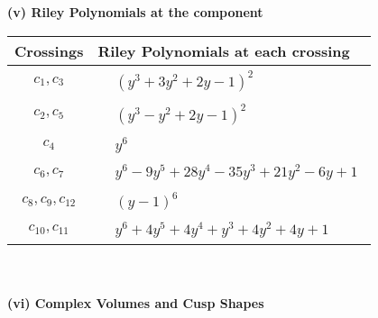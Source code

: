 \documentclass[1p]{elsarticle_modified}
\theoremstyle{definition}
\begin{document}
\newpage\renewcommand{\arraystretch}{1}
\flushleft \textbf{(v) Riley Polynomials at the component}\newline \\
\begin{tabular}{m{50pt}|m{274pt}}
Crossings & \hspace{64pt}Riley Polynomials at each crossing \\
\hline $$\begin{aligned}c_{1},c_{3}\end{aligned}$$&$\begin{aligned}
&(y^3+3 y^2+2 y-1)^2
\end{aligned}$\\
\hline $$\begin{aligned}c_{2},c_{5}\end{aligned}$$&$\begin{aligned}
&(y^3- y^2+2 y-1)^2
\end{aligned}$\\
\hline $$\begin{aligned}c_{4}\end{aligned}$$&$\begin{aligned}
&y^6
\end{aligned}$\\
\hline $$\begin{aligned}c_{6},c_{7}\end{aligned}$$&$\begin{aligned}
&y^6-9 y^5+28 y^4-35 y^3+21 y^2-6 y+1
\end{aligned}$\\
\hline $$\begin{aligned}c_{8},c_{9},c_{12}\end{aligned}$$&$\begin{aligned}
&(y-1)^6
\end{aligned}$\\
\hline $$\begin{aligned}c_{10},c_{11}\end{aligned}$$&$\begin{aligned}
&y^6+4 y^5+4 y^4+y^3+4 y^2+4 y+1
\end{aligned}$\\
\hline
\end{tabular}\\~\\
\newpage\flushleft \textbf{(vi) Complex Volumes and Cusp Shapes}
\end{document}
